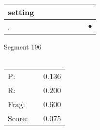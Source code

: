 \documentclass[landscape]{article}
\newcommand{\ssp}{\hspace{2pt}}
\newcommand{\mex}{\cellcolor{g}$\bullet$}
\begin{document}
\begin{tabular}{|l|p{10pt}|p{10pt}|p{10pt}|p{10pt}|p{10pt}|p{10pt}|p{10pt}|}
\hline
\ssp setting \ssp&\hspace{2pt}&\hspace{2pt}&\hspace{2pt}&\hspace{2pt}&\hspace{2pt}&\hspace{2pt}&\hspace{2pt}\\
\hline
\ssp \cellcolor{ref6}. \ssp&\hspace{2pt}&\hspace{2pt}&\hspace{2pt}&\hspace{2pt}&\hspace{2pt}&\hspace{2pt}&\hspace{2pt}\mex\\
\hline
\end{tabular}

\vspace{6pt}
\noindent Segment 196\\\\
\noindent\begin{tabular}{lm{12pt}r}
\hline
P:&&0.136\\
R:&&0.200\\
Frag:&&0.600\\
Score:&&0.075\\
\end{tabular}

\newpage
\end{document}
